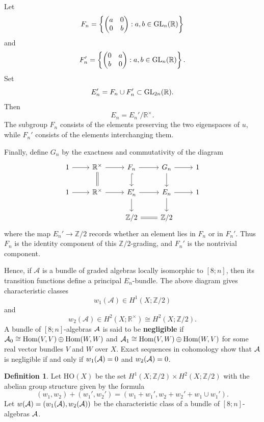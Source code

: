 \documentclass{amsart}
\numberwithin{equation}{section}
\theoremstyle{plain} %
\theoremstyle{definition}
\newtheorem{definition}[equation]{Definition}
\theoremstyle{remark}
\begin{document}
Let
\[
    F_n=
    \left\{
    \begin{pmatrix}
        a & 0\\
        0 & b
    \end{pmatrix}
    : a,b\in \operatorname{GL}_n(\mathbb R)
    \right\}
\]
and
\[
    F_n'=
    \left\{
    \begin{pmatrix}
        0 & a\\
        b & 0
    \end{pmatrix}
    : a,b\in \operatorname{GL}_n(\mathbb R)
    \right\}.
\]
Set
\[
    E_n'=F_n\cup F_n'\subset \operatorname{GL}_{2n}(\mathbb R).
\]
Then
\[
    E_n=E_n'/\mathbb R^\times.
\]
The subgroup $F_n$ consists of the elements preserving the two eigenspaces of
$u$, while $F_n'$ consists of the elements interchanging them.

Finally, define $G_n$ by the exactness and commutativity of the diagram
\[
\begin{tikzcd}
1 \arrow[r] &
\mathbb R^\times \arrow[r] \arrow[d,equal] &
F_n \arrow[r] \arrow[d,hook] &
G_n \arrow[r] \arrow[d] &
1 \\
1 \arrow[r] &
\mathbb R^\times \arrow[r] &
E_n' \arrow[r] \arrow[d] &
E_n \arrow[r] \arrow[d] &
1 \\
&& \mathbb Z/2 \arrow[r,equal] &
\mathbb Z/2
\end{tikzcd}
\]
where the map $E_n'\to \mathbb Z/2$ records whether an element lies in
$F_n$ or in $F_n'$. Thus $F_n$ is the identity component of this
$\mathbb Z/2$-grading, and $F_n'$ is the nontrivial component.

Hence, if $\mathcal A$ is a bundle of graded algebras locally isomorphic to
$[8;n]$, then its transition functions define a principal $E_n$-bundle.
The above diagram gives characteristic classes
\[
    w_1(\mathcal A)\in H^1(X;\mathbb Z/2)
\]
and
\[
    w_2(\mathcal A)\in H^2(X;\mathbb R^\times)
    \cong H^2(X;\mathbb Z/2).
\]
A bundle of $[8;n]$-algebras ${\mathcal{A}}$ is said to be \textbf{negligible} if ${\mathcal{A}}_0 \cong \operatorname{Hom}(V,V) \oplus \operatorname{Hom}(W,W)$ and ${\mathcal{A}}_1 \cong \operatorname{Hom}(V,W) \oplus \operatorname{Hom}(W,V)$ for some real vector bundles $V$ and $W$ over $X$. Exact sequences in cohomology show that ${\mathcal{A}}$ is negligible if and only if $w_1({\mathcal{A}})=0$ and $w_2({\mathcal{A}})=0$. 

\begin{definition}
    Let $\mathrm{HO}(X)$ be the set $H^1(X;\mathbb Z/2) \times H^2(X;\mathbb Z/2)$ with the abelian group structure given by the formula
\[
    (w_1,w_2)+(w_1',w_2')=(w_1+w_1',w_2+w_2'+w_1\cup w_1').
\]
Let $w({\mathcal{A}})=(w_1({\mathcal{A}}),w_2({\mathcal{A}}))$ be the characteristic class of a bundle of $[8;n]$-algebras ${\mathcal{A}}$.
\end{definition}
\end{document}
